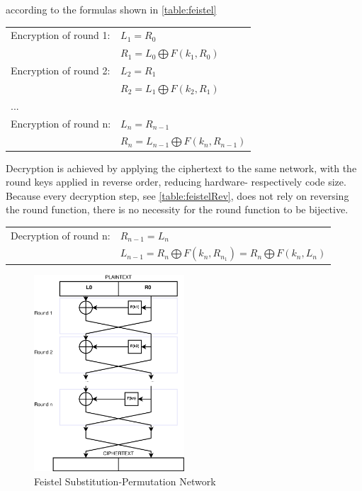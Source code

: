 according to the formulas shown in \ref{table:feistel}
\\
\begin{center}
\begin{tabular}{ l l}
 \label{table:feistel}
  Encryption of round 1: & $L_1 = R_0$  \\ 
   &  $R_1 = L_0 \bigoplus F(k_1, R_0)$\\ \hline
  Encryption of round 2: & $L_{2} = R_1$  \\
   &  $R_{2} = L_1 \bigoplus F(k_2, R_1)$ \\ \hline
   ... &  \\ \hline
   Encryption of round n: & $L_{n} = R_{n-1}$ \\
   & $R_n = L_{n-1} \bigoplus F(k_n, R_{n-1})$ \\
\end{tabular}
\end{center}
Decryption is achieved by applying the ciphertext to the same network, with the round keys applied in reverse order, reducing hardware- respectively
code size. Because every decryption step, see \ref{table:feistelRev}, does not rely on reversing the round function, there is no necessity for the round function to be bijective.
\begin{center}
\begin{tabular}{ l l}
 \label{table:feistelRev}
Decryption of round n: & $R_{n-1} = L_n$  \\
 & $L_{n-1} = R_n \bigoplus F(k_n, R_{n_1}) = R_n \bigoplus F(k_n, L_{n}) $
\end{tabular}
\end{center}

\begin{figure}
    \centering
    \includegraphics[width=0.5\textwidth]{figures/feistel.eps}
    \caption{Feistel Substitution-Permutation Network}
    \label{fig:feistel}
\end{figure}

